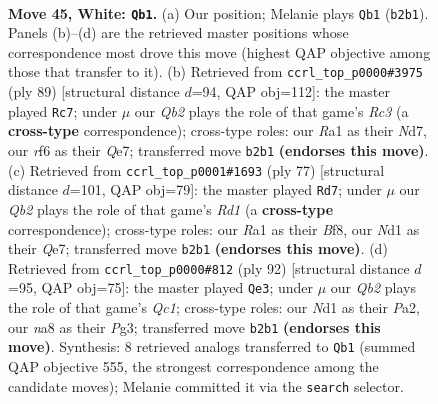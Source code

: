 \documentclass[11pt]{article}
\begin{document}
\clearpage

\begin{figure}[p]\centering
\begin{subfigure}{0.46\textwidth}\centering
\resizebox{\linewidth}{!}{%
\newchessgame
\chessboard[
  setfen={n1r1n1k1/4b3/p4r2/P1pq1p1p/3p1Pp1/1P4P1/1QRBP2P/R2NN1K1 w - - 6 45},
  showmover=false,
  pgfstyle=straightmove, color=movearrow, markmove={b2-b1}
]}
\caption{}
\end{subfigure}\hfill
\begin{subfigure}{0.46\textwidth}\centering
\resizebox{\linewidth}{!}{%
\newchessgame
\chessboard[
  setfen={8/3nqp1k/r1rpb1p1/p3p2p/N1P1P3/1PQ1R2P/2B2PP1/R5K1 b - - 11 45},
  showmover=false,
  pgfstyle=straightmove, color=movearrow, markmove={c6-c7}
]}
\caption{}
\end{subfigure}
\\[4pt]
\begin{subfigure}{0.46\textwidth}\centering
\resizebox{\linewidth}{!}{%
\newchessgame
\chessboard[
  setfen={2rr1bk1/4qpp1/1p2p2p/1P2B3/pnPPN3/2R2P1P/4Q1P1/3R3K b - - 3 39},
  showmover=false,
  pgfstyle=straightmove, color=movearrow, markmove={d8-d7}
]}
\caption{}
\end{subfigure}\hfill
\begin{subfigure}{0.46\textwidth}\centering
\resizebox{\linewidth}{!}{%
\newchessgame
\chessboard[
  setfen={r3rnk1/2p1qpb1/1p1p2p1/3P4/1PP1PBB1/p5P1/P3R1K1/2Q4R w - - 14 47},
  showmover=false,
  pgfstyle=straightmove, color=movearrow, markmove={c1-e3}
]}
\caption{}
\end{subfigure}
\caption{\textbf{Move 45, White: \texttt{Qb1}.} (a) Our position; Melanie plays \texttt{Qb1} (\texttt{b2b1}). Panels (b)--(d) are the retrieved master positions whose correspondence most drove this move (highest QAP objective among those that transfer to it). (b) Retrieved from \texttt{ccrl\_top\_p0000\#3975} (ply 89) [structural distance $d$=94, QAP obj=112]: the master played \texttt{Rc7}; under $\mu$ our \emph{Qb2} plays the role of that game's \emph{Rc3} (a \textbf{cross-type} correspondence); cross-type roles: our \emph{R}a1 as their \emph{N}d7, our \emph{r}f6 as their \emph{Q}e7; transferred move \texttt{b2b1} \textbf{(endorses this move)}. (c) Retrieved from \texttt{ccrl\_top\_p0001\#1693} (ply 77) [structural distance $d$=101, QAP obj=79]: the master played \texttt{Rd7}; under $\mu$ our \emph{Qb2} plays the role of that game's \emph{Rd1} (a \textbf{cross-type} correspondence); cross-type roles: our \emph{R}a1 as their \emph{B}f8, our \emph{N}d1 as their \emph{Q}e7; transferred move \texttt{b2b1} \textbf{(endorses this move)}. (d) Retrieved from \texttt{ccrl\_top\_p0000\#812} (ply 92) [structural distance $d$=95, QAP obj=75]: the master played \texttt{Qe3}; under $\mu$ our \emph{Qb2} plays the role of that game's \emph{Qc1}; cross-type roles: our \emph{N}d1 as their \emph{P}a2, our \emph{n}a8 as their \emph{P}g3; transferred move \texttt{b2b1} \textbf{(endorses this move)}. Synthesis: 8 retrieved analogs transferred to \texttt{Qb1} (summed QAP objective 555, the strongest correspondence among the candidate moves); Melanie committed it via the \texttt{search} selector.}
\label{fig:thought-m88}
\end{figure}
\end{document}
